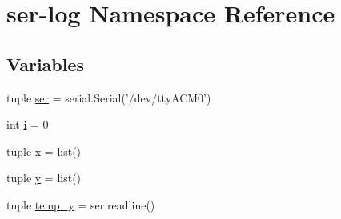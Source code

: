 \hypertarget{namespaceser-log}{\section{ser-\/log Namespace Reference}
\label{namespaceser-log}
}
\subsection*{Variables}
\begin{DoxyCompactItemize}
\item 
tuple \hyperlink{namespaceser-log_ae5e2c2855fe8c235874474c5277745ac}{ser} = serial.\-Serial('/dev/tty\-A\-C\-M0')
\item 
int \hyperlink{namespaceser-log_a07a12eb5896dee0953b2f34bf4e3e0d8}{i} = 0
\item 
tuple \hyperlink{namespaceser-log_ad4c918427408ee85c0def9ccf3a8cdaa}{x} = list()
\item 
tuple \hyperlink{namespaceser-log_a6381ab980f595f0e94c91312cc3020c5}{y} = list()
\item 
tuple \hyperlink{namespaceser-log_af746ba3a68039d15d0a46e905dc990d2}{temp\-\_\-y} = ser.\-readline()
\end{DoxyCompactItemize}



